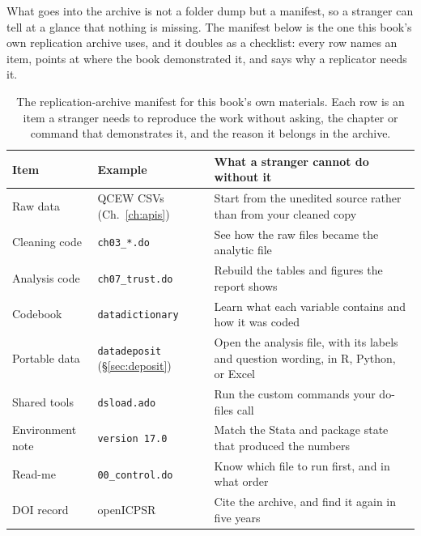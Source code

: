 What goes into the archive is not a folder dump but a manifest, so a stranger can tell at a glance that nothing is missing. The manifest below is the one this book's own replication archive uses, and it doubles as a checklist: every row names an item, points at where the book demonstrated it, and says why a replicator needs it.

\begin{table}[htbp]
\centering
\caption[A replication-archive manifest]{The replication-archive manifest for this book's own materials. Each row is an item a stranger needs to reproduce the work without asking, the chapter or command that demonstrates it, and the reason it belongs in the archive.}
\label{tab:manifest}
\begin{tabular}{@{}p{3.0cm}p{3.4cm}p{8.4cm}@{}}
\hline
Item & Example & What a stranger cannot do without it \\
\hline
Raw data          & QCEW CSVs (Ch.~\ref{ch:apis})  & Start from the unedited source rather than from your cleaned copy \\
Cleaning code     & \texttt{ch03\_*.do}  & See how the raw files became the analytic file \\
Analysis code     & \texttt{ch07\_trust.do} & Rebuild the tables and figures the report shows \\
Codebook          & \texttt{datadictionary}  & Learn what each variable contains and how it was coded \\
Portable data     & \texttt{datadeposit} (\S\ref{sec:deposit}) & Open the analysis file, with its labels and question wording, in R, Python, or Excel \\
Shared tools      & \texttt{dsload.ado}  & Run the custom commands your do-files call \\
Environment note  & \texttt{version 17.0} & Match the Stata and package state that produced the numbers \\
Read-me           & \texttt{00\_control.do} & Know which file to run first, and in what order \\
DOI record        & openICPSR            & Cite the archive, and find it again in five years \\
\hline
\end{tabular}
\end{table}

